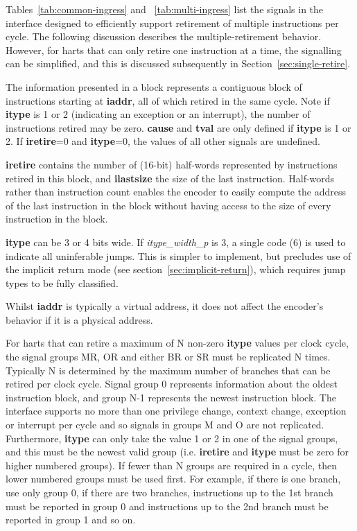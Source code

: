 Tables~\ref{tab:common-ingress} and ~\ref{tab:multi-ingress}
list the signals in the interface designed to efficiently support retirement of multiple 
instructions per cycle.  The following discussion describes the multiple-retirement behavior.  
However, for harts that can only retire one instruction at a time, the signalling can be 
simplified, and this is discussed subsequently in Section~\ref{sec:single-retire}.  

The information presented in a block represents a contiguous
block of instructions starting at \textbf{iaddr}, all of which retired
in the same cycle. Note if \textbf{itype} is 1 or 2 (indicating an
exception or an interrupt), the number of instructions retired may be
zero. \textbf{cause} and \textbf{tval} are only defined if
\textbf{itype} is 1 or 2. If \textbf{iretire}=0 and \textbf{itype}=0,
the values of all other signals are undefined.

\textbf{iretire} contains the number of (16-bit) half-words represented by
instructions retired in this block, and \textbf{ilastsize} the size of the last
instruction.  Half-words rather than instruction count enables the encoder to easily compute the address of
the last instruction in the block without having access to the size of every 
instruction in the block.  

\textbf{itype} can be 3 or 4 bits wide.  If \textit{itype\_width\_p} is 3, a single code (6) is used to 
indicate all uninferable jumps.  This is simpler to implement, but precludes use of the implicit return mode
(see section~\ref{sec:implicit-return}), which requires jump types to be fully classified.

Whilst \textbf{iaddr} is typically a virtual address, it does not affect the encoder's behavior
if it is a physical address.

For harts that can retire a maximum of N non-zero \textbf{itype} values per clock
cycle, the signal groups MR, OR and either BR or SR must be replicated N times.  
Typically N is determined by the maximum number of branches that can be retired per clock cycle.
Signal group 0 represents information about the oldest instruction block, and group N-1
represents the newest instruction block. The interface supports no more
than one privilege change, context change, 
exception or interrupt per cycle and so signals in
groups M and O are not replicated. Furthermore, \textbf{itype} can only
take the value 1 or 2 in one of the signal groups, and this must be
the newest valid group (i.e. \textbf{iretire} and \textbf{itype} must
be zero for higher numbered groups). If fewer than N groups are required 
in a cycle, then lower numbered groups must be used
first. For example, if there is one branch, use only group 0, if
there are two branches, instructions up to the 1st branch
must be reported in group 0 and instructions up to the 2nd branch
must be reported in group 1 and so on.

